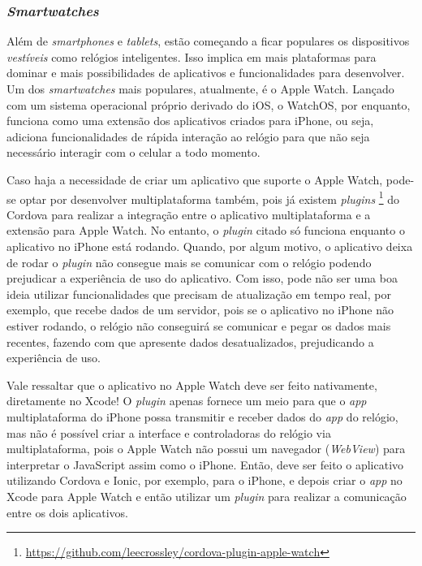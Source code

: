 \subsubsection{\textit{Smartwatches}} \label{subsubsec:facial}

Além de \textit{smartphones} e \textit{tablets}, estão começando a ficar populares os dispositivos \textit{vestíveis} como relógios inteligentes. Isso implica em mais plataformas para dominar 
e mais possibilidades de aplicativos e funcionalidades para desenvolver. Um dos \textit{smartwatches} mais populares, atualmente, é o Apple Watch. Lançado com um sistema operacional próprio derivado do iOS, o WatchOS, 
por enquanto, funciona como uma extensão dos aplicativos criados para iPhone, ou seja, adiciona funcionalidades de rápida interação ao relógio para que não seja necessário interagir com o celular a todo momento.

Caso haja a necessidade de criar um aplicativo que suporte o Apple Watch, pode-se optar por desenvolver multiplataforma também, pois já existem \textit{plugins}
\footnote{\url{https://github.com/leecrossley/cordova-plugin-apple-watch}} do Cordova para realizar a integração entre o aplicativo multiplataforma e a extensão para Apple Watch. No entanto, o \textit{plugin} 
citado só funciona enquanto o aplicativo no iPhone está rodando. Quando, por algum motivo, o aplicativo deixa de rodar o \textit{plugin} não consegue mais se comunicar com o relógio podendo prejudicar a experiência 
de uso do aplicativo. Com isso, pode não ser uma boa ideia utilizar funcionalidades que precisam de atualização em tempo real, por exemplo, que recebe dados de um servidor, pois se o aplicativo no iPhone não 
estiver rodando, o relógio não conseguirá se comunicar e pegar os dados mais recentes, fazendo com 
que apresente dados desatualizados, prejudicando a experiência de uso.

Vale ressaltar que o aplicativo no Apple Watch deve ser feito nativamente, diretamente no Xcode! O \textit{plugin} apenas fornece um meio para que o \textit{app} multiplataforma do iPhone possa transmitir e receber 
dados do \textit{app} do relógio, mas não é possível criar a interface e controladoras do relógio via multiplataforma, pois o Apple Watch não possui um navegador (\textit{WebView}) para interpretar o JavaScript assim 
como o iPhone. Então, deve ser feito o aplicativo utilizando Cordova e Ionic, por exemplo, para o iPhone, e depois criar o \textit{app} no Xcode para Apple Watch e então utilizar um \textit{plugin} para realizar a 
comunicação entre os dois aplicativos.  

